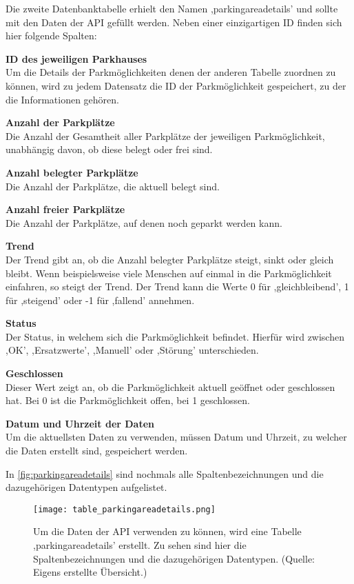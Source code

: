 Die zweite Datenbanktabelle erhielt den Namen ,parkingareadetails' und sollte mit den Daten der API gefüllt werden. Neben einer einzigartigen ID finden sich hier folgende Spalten: 
\begin{description}
	\item \textbf{ID des jeweiligen Parkhauses} \\ Um die Details der Parkmöglichkeiten denen der anderen Tabelle zuordnen zu können, wird zu jedem Datensatz die ID der Parkmöglichkeit gespeichert, zu der die Informationen gehören.
	\item \textbf{Anzahl der Parkplätze} \\ Die Anzahl der Gesamtheit aller Parkplätze der jeweiligen Parkmöglichkeit, unabhängig davon, ob diese belegt oder frei sind.
	\item \textbf{Anzahl belegter Parkplätze} \\ Die Anzahl der Parkplätze, die aktuell belegt sind.
	\item \textbf{Anzahl freier Parkplätze} \\ Die Anzahl der Parkplätze, auf denen noch geparkt werden kann.
	\item \textbf{Trend} \\ Der Trend gibt an, ob die Anzahl belegter Parkplätze steigt, sinkt oder gleich bleibt. Wenn beispielsweise viele Menschen auf einmal in die Parkmöglichkeit einfahren, so steigt der Trend. Der Trend kann die Werte 0 für ,gleichbleibend', 1 für ,steigend' oder -1 für ,fallend' annehmen.
	\item \textbf{Status} \\ Der Status, in welchem sich die Parkmöglichkeit befindet. Hierfür wird zwischen ,OK', ,Ersatzwerte', ,Manuell' oder ,Störung' unterschieden.
	\item \textbf{Geschlossen} \\ Dieser Wert zeigt an, ob die Parkmöglichkeit aktuell geöffnet oder geschlossen hat. Bei 0 ist die Parkmöglichkeit offen, bei 1 geschlossen.
	\item \textbf{Datum und Uhrzeit der Daten} \\ Um die aktuellsten Daten zu verwenden, müssen Datum und Uhrzeit, zu welcher die Daten erstellt sind, gespeichert werden.
\end{description}
In \autoref{fig:parkingareadetails} sind nochmals alle Spaltenbezeichnungen und die dazugehörigen Datentypen aufgelistet.

\begin{figure}[h]
	\centering
	\texttt{[image: table\_parkingareadetails.png]}
	\caption[Um die Daten der API verwenden zu können, wird eine Tabelle ,parkingareadetails' erstellt. Zu sehen sind hier die Spaltenbezeichnungen und die dazugehörigen Datentypen.]
	{Um die Daten der API verwenden zu können, wird eine Tabelle ,parkingareadetails' erstellt. Zu sehen sind hier die Spaltenbezeichnungen und die dazugehörigen Datentypen. (Quelle: Eigens erstellte Übersicht.)}
	\label{fig:parkingareadetails}
\end{figure}